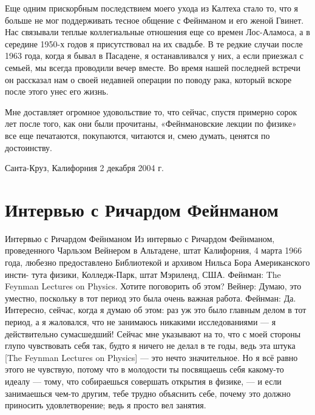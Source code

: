 \documentclass[11pt,oneside]{article}
\begin{document}
Еще одним прискорбным последствием моего ухода из Калтеха стало то, что я больше не мог поддерживать тесное общение с Фейнманом и его женой Гвинет. Нас связывали теплые коллегиальные отношения еще со времен Лос-Аламоса, а в середине 1950-х годов я присутствовал на их свадьбе. В те редкие случаи после 1963 года, когда я бывал в Пасадене, я останавливался у них, а если приезжал с семьей, мы всегда проводили вечер вместе. Во время нашей последней встречи он рассказал нам о своей недавней операции по поводу рака, который вскоре после этого унес его жизнь.\par



Мне доставляет огромное удовольствие то, что сейчас, спустя примерно сорок лет после того, как они были прочитаны, «Фейнмановские лекции по физике» все еще печатаются, покупаются, читаются и, смею думать, ценятся по достоинству.\par



Санта-Круз, Калифорния 2 декабря 2004 г.\par



\clearpage


\section*{Интервью с Ричардом Фейнманом}



\label{tips-sec-6-интервью-с-ричардом-фейнманом}


Интервью с Ричардом Фейнманом Из интервью с Ричардом Фейнманом, проведенного Чарльзом Вейнером в Альтадене, штат Калифорния, 4 марта 1966 года, любезно предоставлено Библиотекой и архивом Нильса Бора Американского инсти- тута физики, Колледж-Парк, штат Мэриленд, США. Фейнман: The Feynman Lectures on Physics. Хотите поговорить об этом? Вейнер: Думаю, это уместно, поскольку в тот период это была очень важная работа. Фейнман: Да. Интересно, сейчас, когда я думаю об этом: раз уж это было главным делом в тот период, а я жаловался, что не занимаюсь никакими исследованиями --- я действительно сумасшедший! Сейчас мне указывают на то, что с моей стороны глупо чувствовать себя так, будто я ничего не делал в те годы, ведь эта штука [The Feynman Lectures on Physics] --- это нечто значительное. Но я всё равно этого не чувствую, потому что в молодости ты посвящаешь себя какому-то идеалу --- тому, что собираешься совершать открытия в физике, --- и если занимаешься чем-то другим, тебе трудно объяснить себе, почему это должно приносить удовлетворение; ведь я просто вел занятия.\par
\end{document}
